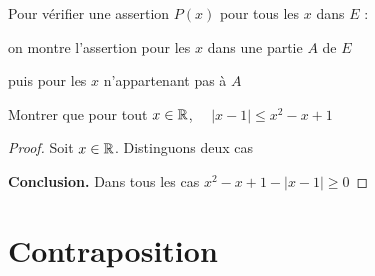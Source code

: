 \begin{frame}


Pour vérifier une assertion $P(x)$ pour tous les $x$ dans $E$ :

\qquad on montre l'assertion pour les $x$ dans une partie $A$ de $E$ 

\qquad puis pour les $x$ n'appartenant pas à $A$

\pause

\begin{exemple}
Montrer que pour tout $x\in \mathbb{R}$, \ \ $|x-1| \le x^2-x+1$
\end{exemple}

\pause
\medskip

\begin{proof}
Soit $x \in \mathbb{R}$. Distinguons deux cas

\pause





\pause
\pause
\pause
\pause

\textbf{Conclusion.} \quad Dans tous les cas $x^2-x+1 - |x-1| \ge 0$
\end{proof}

  
\end{frame}


\section{Contraposition}

